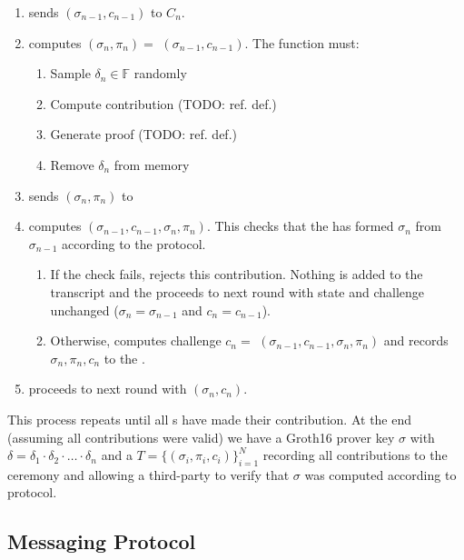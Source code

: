 \begin{enumerate}
\item \Coordinator{} sends $(\sigma_{n-1}, c_{n-1})$ to \Contributor{} $C_n$.
\item \Contributor{} computes $(\sigma_n, \pi_n) = $ \contribute{}$(\sigma_{n-1}, c_{n-1})$. The \contribute{} function must:
    \begin{enumerate}
        \item Sample $\delta_n \in \mathbb{F}$ randomly
        \item Compute contribution (TODO: ref. def.)
        \item Generate proof (TODO: ref. def.)
        \item Remove $\delta_n$ from memory
    \end{enumerate}
\item \Contributor{} sends $(\sigma_n, \pi_n)$ to \Coordinator{}
\item \Coordinator{} computes \verify{}$(\sigma_{n-1}, c_{n-1}, \sigma_n, \pi_n)$. This checks that the \Contributor{} has formed $\sigma_n$ from $\sigma_{n-1}$ according to the protocol.
    \begin{enumerate}
        \item If the check fails, \Coordinator{} rejects this contribution. Nothing is added to the transcript and the \Coordinator{} proceeds to next round with state and challenge unchanged ($\sigma_n = \sigma_{n-1}$ and $c_n = c_{n-1}$).
        \item Otherwise, \Coordinator{} computes challenge $c_n = $ \challenge$(\sigma_{n-1}, c_{n-1}, \sigma_n, \pi_n)$ and records $\sigma_n, \pi_n, c_n$ to the \Transcript{}.
    \end{enumerate}
\item \Coordinator{} proceeds to next round with $(\sigma_n, c_n)$.
\end{enumerate}
This process repeats until all \Contributor{}s have made their contribution. At the end (assuming all contributions were valid) we have a Groth16 prover key $\sigma$ with $\delta = \delta_1 \cdot \delta_2 \cdot \ldots \cdot \delta_n $ and a \Transcript{} $T = \{ (\sigma_i, \pi_i, c_i) \}_{i=1}^N $ recording all contributions to the ceremony and allowing a third-party to verify that $\sigma$ was computed according to protocol.

\subsection{Messaging Protocol}\label{sec: MessagingProtocol}

